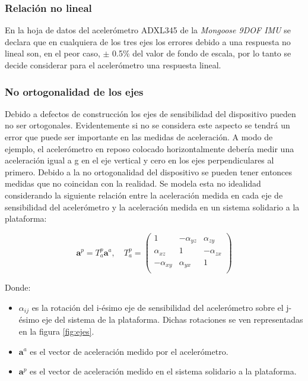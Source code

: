 \documentclass[main]{subfiles}
\begin{document}
\subsubsection*{Relación no lineal}
En la hoja de datos del acelerómetro ADXL345 de la \emph{Mongoose 9DOF IMU} se declara que en cualquiera de los tres ejes los errores debido a una respuesta no lineal son, en el peor caso, $\pm$ 0.5\% del valor de fondo de escala, por lo tanto se decide considerar para el acelerómetro una respuesta lineal.

\subsubsection*{No ortogonalidad de los ejes}
Debido a defectos de construcción los ejes de sensibilidad del dispositivo pueden no ser ortogonales. Evidentemente si no se considera este aspecto se tendrá un error que puede ser importante en las medidas de aceleración. A modo de ejemplo, el acelerómetro en reposo colocado horizontalmente debería medir una aceleración igual a g en el eje vertical y cero en los ejes perpendiculares al primero. Debido a la no ortogonalidad del dispositivo se pueden tener entonces medidas que no coincidan con la realidad. Se modela esta no idealidad considerando la siguiente relación entre la aceleración medida en cada eje de sensibilidad del acelerómetro y la aceleración medida en un sistema solidario a la plataforma:

$$\mathbf{a}^p=T^p_a \mathbf{a}^a, \quad  T^p_a=\left( \begin{matrix}
1 &-\alpha_{yz} &\alpha_{zy}\\
\alpha_{xz} &1& -\alpha_{zx} \\
-\alpha_{xy} &\alpha_{yx} &1\\
\end{matrix} 
\right)$$

Donde:
\begin{itemize}
\item $\alpha_{ij}$ es la rotación del  i-ésimo eje de sensibilidad del acelerómetro sobre el j-ésimo eje del sistema de la plataforma. Dichas rotaciones se ven representadas en la figura \ref{fig:ejes}.
\item $\mathbf{a}^a$ es el vector de aceleración medido por el acelerómetro.
\item $\mathbf{a}^p$ es el vector de aceleración medido en el sistema solidario a la plataforma.
\end{itemize}
\end{document}
